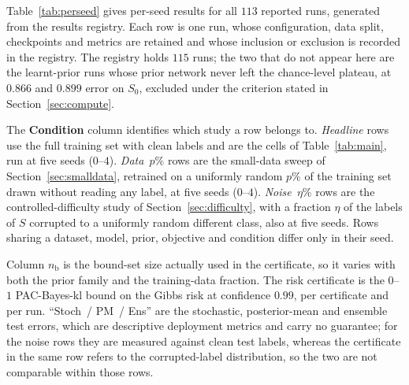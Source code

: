 Table~\ref{tab:perseed} gives per-seed results for all $113$ reported runs,
generated from the results registry. Each row is one run, whose configuration,
data split, checkpoints and metrics are retained and whose inclusion or exclusion
is recorded in the registry. The registry holds $115$ runs; the two that do not
appear here are the learnt-prior runs whose prior network never left the
chance-level plateau, at $0.866$ and $0.899$ error on $S_0$, excluded under the
criterion stated in Section~\ref{sec:compute}.

The \textbf{Condition} column identifies which study a row belongs to.
\emph{Headline} rows use the full training set with clean labels and are the cells
of Table~\ref{tab:main}, run at five seeds ($0$--$4$). \emph{Data~$p\%$} rows are
the small-data sweep of Section~\ref{sec:smalldata}, retrained on a uniformly
random $p\%$ of the training set drawn without reading any label, at five seeds
($0$--$4$).
\emph{Noise~$\eta\%$} rows are the controlled-difficulty study of
Section~\ref{sec:difficulty}, with a fraction $\eta$ of the labels of $S$
corrupted to a uniformly random different class, also at five seeds. Rows sharing
a dataset, model, prior, objective and condition differ only in their seed.

Column $n_{\mathrm b}$ is the bound-set size actually used in the certificate, so
it varies with both the prior family and the training-data fraction. The risk
certificate is the $0$--$1$ PAC-Bayes-kl bound on the Gibbs risk at confidence
$0.99$, per certificate and per run. ``Stoch~/ PM~/ Ens'' are the stochastic,
posterior-mean and ensemble test errors, which are descriptive deployment metrics
and carry no guarantee; for the noise rows they are measured against clean test
labels, whereas the certificate in the same row refers to the corrupted-label
distribution, so the two are not comparable within those rows.


